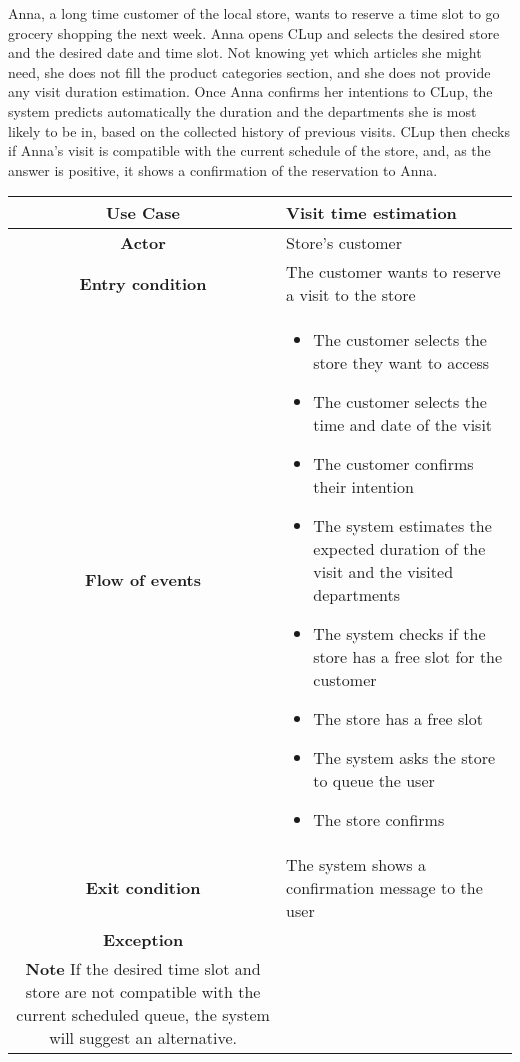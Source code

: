 \documentclass[../../main.tex]{subfiles}
\begin{document}
    Anna, a long time customer of the local store, wants to reserve a time slot to go grocery shopping the next week. 
    Anna opens CLup and selects the desired store and the desired date and time slot. 
    Not knowing yet which articles she might need, she does not fill the product categories section, 
    and she does not provide any visit duration estimation. Once Anna confirms her intentions to CLup, 
    the system predicts automatically the duration and the departments she is most likely to be in, 
    based on the collected history of previous visits. CLup then checks if Anna's visit is compatible with the 
    current schedule of the store, and, as the answer is positive, it shows a confirmation of the reservation to Anna.

    \begin{table}[H]
      \centering
        \begin{tabular}{c m{}}
        \hline
        \textbf{Use Case} & Visit time estimation\\ \hline
        \textbf{Actor} & Store's customer\\ \hline
        \textbf{Entry condition} & The customer wants to reserve a visit to the store\\  \hline
        \textbf{Flow of events} & \begin{itemize}
                                    \item The customer selects the store they want to access
                                    \item The customer selects the time and date of the visit
                                    \item The customer confirms their intention
                                    \item The system estimates the expected duration of the visit and the visited departments
                                    \item The system checks if the store has a free slot for the customer
                                    \item The store has a free slot
                                    \item The system asks the store to queue the user
                                    \item The store confirms
                                  \end{itemize}\\ \hline
        \textbf{Exit condition} & The system shows a confirmation message to the user \\ \hline
        \textbf{Exception} & \\ \hline
        \textbf{Note} If the desired time slot and store are not compatible with the current scheduled queue, the system will suggest an alternative.& \\ \hline
        \end{tabular}
    \end{table}



        
\end{document}
